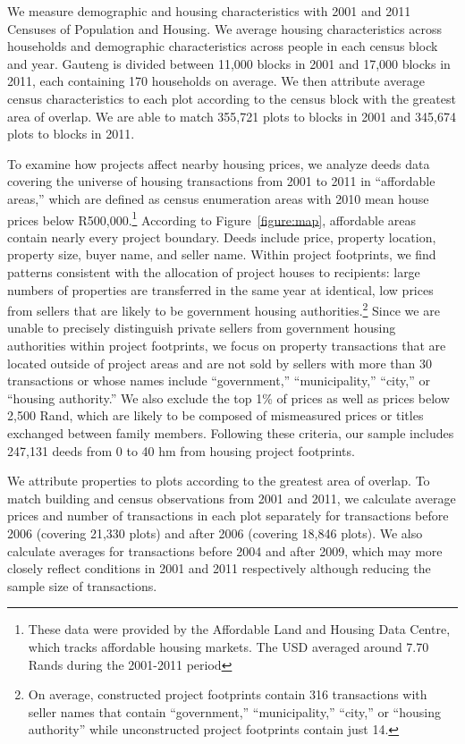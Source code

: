 \documentclass[12pt]{article}
\begin{document}
We measure demographic and housing characteristics with 2001 and 2011 Censuses of Population and Housing.  We average housing characteristics across households and demographic characteristics across people in each census block and year.  Gauteng is divided between 11,000 blocks in 2001 and 17,000 blocks in 2011, each containing 170 households on average.  We then attribute average census characteristics to each plot according to the census block with the greatest area of overlap.  We are able to match 355,721 plots to blocks in 2001 and 345,674 plots to blocks in 2011.

To examine how projects affect nearby housing prices, we analyze deeds data covering the universe of housing transactions from 2001 to 2011 in ``affordable areas,'' which are defined as census enumeration areas with 2010 mean house prices below R500,000.\footnote{These data were provided by the Affordable Land and Housing Data Centre, which tracks affordable housing markets.  The USD averaged around 7.70 Rands during the 2001-2011 period}  According to Figure~\ref{figure:map}, affordable areas contain nearly every project boundary.  Deeds include price, property location, property size, buyer name, and seller name.  Within project footprints, we find patterns consistent with the allocation of project houses to recipients: large numbers of properties are transferred in the same year at identical, low prices from sellers that are likely to be government housing authorities.\footnote{On average, constructed project footprints contain 316 transactions with seller names that contain ``government,'' ``municipality,'' ``city,'' or ``housing authority'' while unconstructed project footprints contain just 14.}  Since we are unable to precisely distinguish private sellers from government housing authorities within project footprints, we focus on property transactions that are located outside of project areas and are not sold by sellers with more than 30 transactions or whose names include ``government,'' ``municipality,'' ``city,'' or ``housing authority.''  We also exclude the top 1\% of prices as well as prices below 2,500 Rand, which are likely to be composed of mismeasured prices or titles exchanged between family members.  Following these criteria, our sample includes 247,131 deeds from 0 to 40 hm from housing project footprints.  

We attribute properties to plots according to the greatest area of overlap.  To match building and census observations from 2001 and 2011, we calculate average prices and number of transactions in each plot separately for transactions before 2006 (covering 21,330 plots) and after 2006 (covering 18,846 plots).  We also calculate averages for transactions before 2004 and after 2009, which may more closely reflect conditions in 2001 and 2011 respectively although reducing the sample size of transactions.
\end{document}
